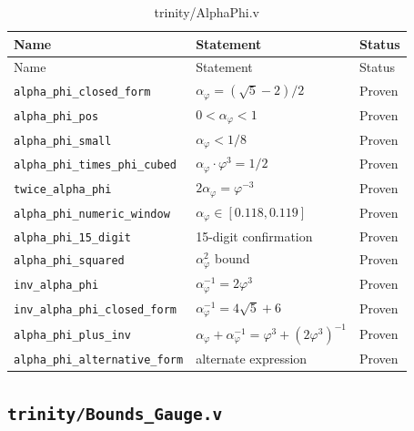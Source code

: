 \begin{longtable}{lll}
\toprule
Name & Statement & Status \\
\midrule
\endfirsthead
\toprule
Name & Statement & Status \\
\midrule
\endhead
\bottomrule
\endfoot
\bottomrule
\caption{trinity/AlphaPhi.v}
\endlastfoot
\texttt{alpha\_phi\_closed\_form} &
  $\alpha_{\varphi}=(\sqrt{5}-2)/2$ & Proven \\
\texttt{alpha\_phi\_pos} & $0<\alpha_{\varphi}<1$ & Proven \\
\texttt{alpha\_phi\_small} & $\alpha_{\varphi}<1/8$ & Proven \\
\texttt{alpha\_phi\_times\_phi\_cubed} &
  $\alpha_{\varphi}\cdot\varphi^{3}=1/2$ & Proven \\
\texttt{twice\_alpha\_phi} &
  $2\alpha_{\varphi}=\varphi^{-3}$ & Proven \\
\texttt{alpha\_phi\_numeric\_window} &
  $\alpha_{\varphi}\in[0.118,0.119]$ & Proven \\
\texttt{alpha\_phi\_15\_digit} &
  15-digit confirmation & Proven \\
\texttt{alpha\_phi\_squared} & $\alpha_{\varphi}^{2}$ bound & Proven \\
\texttt{inv\_alpha\_phi} &
  $\alpha_{\varphi}^{-1}=2\varphi^{3}$ & Proven \\
\texttt{inv\_alpha\_phi\_closed\_form} &
  $\alpha_{\varphi}^{-1}=4\sqrt{5}+6$ & Proven \\
\texttt{alpha\_phi\_plus\_inv} &
  $\alpha_{\varphi}+\alpha_{\varphi}^{-1}
   =\varphi^{3}+(2\varphi^{3})^{-1}$ & Proven \\
\texttt{alpha\_phi\_alternative\_form} &
  alternate expression & Proven \\
\end{longtable}

\subsection{\texttt{trinity/Bounds\_Gauge.v}}
\label{sec:A-coq-gauge}

